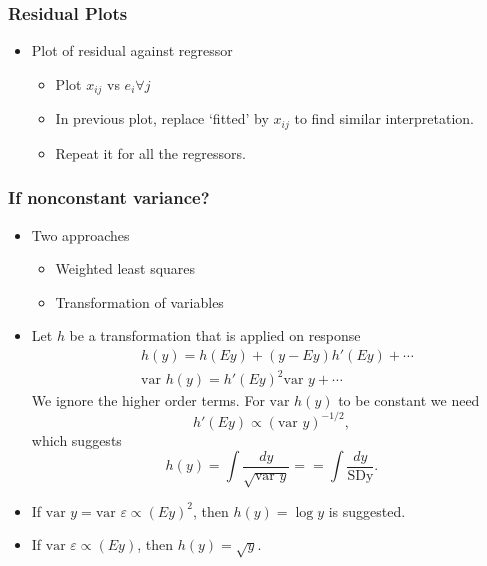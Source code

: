 \documentclass[10pt]{beamer} %
\begin{document}
\begin{frame}
   \frametitle{Residual Plots}
   \begin{itemize}

      \item Plot of residual against regressor
         \vspace{0.5cm}
         \begin{itemize}
            \item Plot $x_{ij}$ vs $e_i \forall j$
               \vspace{0.5cm}
            \item In previous plot, replace `fitted' by $x_{ij}$ to find similar interpretation.
               \vspace{0.5cm}
            \item Repeat it for all the regressors. 

         \end{itemize}
   \end{itemize}
\end{frame}

\begin{frame}
   \frametitle{If nonconstant variance?}
   \begin{itemize}
      \item Two approaches
         \begin{itemize}
            \item Weighted least squares
            \item Transformation of variables
         \end{itemize}
      \item Let $h$ be a transformation that is applied on response
         \begin{align*}
            & h(y) = h(Ey) + (y - Ey)h'(Ey) + \cdots \\
            & \text{var } h(y) = h'(Ey)^2\text{var } y + \cdots
         \end{align*}
         We ignore the higher order terms. For $\text{var } h(y)$ to be constant we need
         $$ h'(Ey) \propto (\text{var } y)^{-1/2}, $$
         which suggests
         $$ h(y) = \int \frac{dy}{\sqrt{\text{var } y}} == \int
         \frac{dy}{\text{SDy}}. $$
      \item If $\text{var } y = \text{var } \varepsilon \propto
         (Ey)^2$, then $h(y)=\log y$ is suggested.
      \item If $\text{var } \varepsilon \propto (Ey)$, then $h(y) = \sqrt{y}$.
   \end{itemize}
\end{frame}
\end{document}
